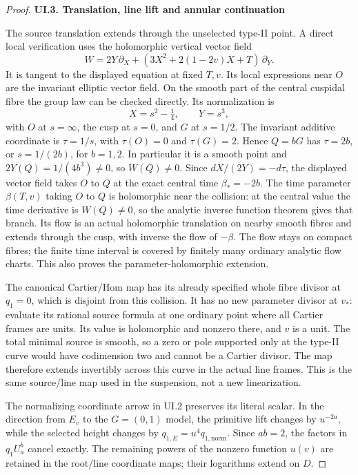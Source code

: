 \begin{proof}
\par

\medskip\noindent\textbf{UI.3. Translation, line lift and annular continuation}

\par\nobreak

The source translation extends through the unselected type-II
point. A direct local verification uses the holomorphic vertical
vector field
\[
 W=2Y\,\partial_X+
       (3X^2+2(1-2v)X+T)\,\partial_Y.
\]
It is tangent to the displayed equation at fixed \(T,v\). Its
local expressions near \(O\) are the invariant elliptic vector
field. On the smooth part of the central cuspidal fibre the
group law can be checked directly. Its normalization is
\[
 X=s^2-\tfrac14,\qquad Y=s^3,
\]
with \(O\) at \(s=\infty\), the cusp at \(s=0\), and
\(G\) at \(s=1/2\). The invariant additive coordinate is
\(\tau=1/s\), with \(\tau(O)=0\) and \(\tau(G)=2\).
Hence \(Q=bG\) has \(\tau=2b\), or \(s=1/(2b)\), for
\(b=1,2\). In particular it is a smooth point and
\(2Y(Q)=1/(4b^3)\ne0\), so \(W(Q)\ne0\). Since
\(dX/(2Y)=-d\tau\), the displayed vector field takes \(O\)
to \(Q\) at the exact central time \(\beta_*=-2b\).
The time parameter \(\beta(T,v)\) taking \(O\) to \(Q\)
is holomorphic near the collision: at the central value the
time derivative is \(W(Q)\ne0\), so the analytic inverse
function theorem gives that branch. Its flow is an actual
holomorphic translation on nearby smooth fibres and extends
through the cusp, with inverse the flow of \(-\beta\). The
flow stays on compact fibres; the finite time interval is
covered by finitely many ordinary analytic flow charts. This
also proves the parameter-holomorphic extension.

The canonical Cartier/Hom map has its already specified whole
fibre divisor at \(q_1=0\), which is disjoint from this
collision. It has no new parameter divisor at \(v_*\): evaluate
its rational source formula at one ordinary point where all
Cartier frames are units. Its value is holomorphic and nonzero
there, and \(v\) is a unit. The total minimal source is smooth,
so a zero or pole supported only at the type-II curve would
have codimension two and cannot be a Cartier divisor. The map
therefore extends invertibly across this curve in the actual
line frames. This is the same source/line map used in the
suspension, not a new linearization.

The normalizing coordinate arrow in UI.2 preserves its literal
scalar. In the direction from \(E_v\) to the \(G=(0,1)\) model,
the primitive lift changes by \(u^{-2a}\), while the selected
height changes by \(q_{1,E}=u^4q_{1,\mathrm{norm}}\). Since
\(ab=2\), the factors in \(q_1U_a^b\) cancel exactly. The
remaining powers of the nonzero function \(u(v)\) are retained
in the root/line coordinate maps; their logarithms extend on
\(D\).


\end{proof}
